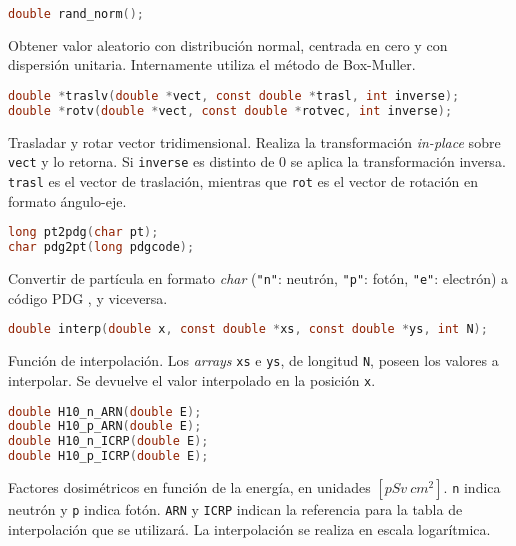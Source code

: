 \begin{footnotesize}

\begin{lstlisting}[language=C]
double rand_norm();
\end{lstlisting}
\begin{addmargin}[0.5cm]{0cm}
Obtener valor aleatorio con distribución normal, centrada en cero y con dispersión unitaria. Internamente utiliza el método de Box-Muller.
\end{addmargin}

\begin{lstlisting}[language=C]
double *traslv(double *vect, const double *trasl, int inverse);
double *rotv(double *vect, const double *rotvec, int inverse);
\end{lstlisting}
\begin{addmargin}[0.5cm]{0cm}
Trasladar y rotar vector tridimensional. Realiza la transformación \emph{in-place} sobre \verb|vect| y lo retorna. Si \verb|inverse| es distinto de 0 se aplica la transformación inversa. \verb|trasl| es el vector de traslación, mientras que \verb|rot| es el vector de rotación en formato ángulo-eje.
\end{addmargin}

\begin{lstlisting}[language=C]
long pt2pdg(char pt);
char pdg2pt(long pdgcode);
\end{lstlisting}
\begin{addmargin}[0.5cm]{0cm}
Convertir de partícula en formato \emph{char} (\verb|"n"|: neutrón, \verb|"p"|: fotón, \verb|"e"|: electrón) a código PDG \cite{PDG}, y viceversa.
\end{addmargin}

\begin{lstlisting}[language=C]
double interp(double x, const double *xs, const double *ys, int N);
\end{lstlisting}
\begin{addmargin}[0.5cm]{0cm}
Función de interpolación. Los \emph{arrays} \verb|xs| e \verb|ys|, de longitud \verb|N|, poseen los valores a interpolar. Se devuelve el valor interpolado en la posición \verb|x|.
\end{addmargin}

\begin{lstlisting}[language=C]
double H10_n_ARN(double E);
double H10_p_ARN(double E);
double H10_n_ICRP(double E);
double H10_p_ICRP(double E);
\end{lstlisting}
\begin{addmargin}[0.5cm]{0cm}
Factores dosimétricos en función de la energía, en unidades $[pSv\ cm^2]$. \verb|n| indica neutrón y \verb|p| indica fotón. \verb|ARN| y \verb|ICRP| indican la referencia para la tabla de interpolación que se utilizará. La interpolación se realiza en escala logarítmica.
\end{addmargin}

\end{footnotesize}

